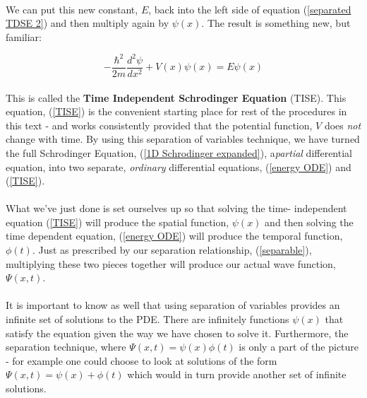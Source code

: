 \documentclass[12pt,letterpaper]{book}
\begin{document}
\paragraph*{} We can put this new constant, $E$, back into the left side of equation (\ref{separated TDSE 2}) and then multiply again by $\psi(x)$. The result is something new, but familiar:

\begin{equation}
\label{TISE}
-\frac{\hbar^2}{2m}\frac{d^2\psi}{dx^2} + V(x)\psi(x) = E\psi(x)
\end{equation}

\paragraph*{}This is called the \textbf{Time Independent Schrodinger Equation} (TISE). This equation, (\ref{TISE}) is the convenient starting place for rest of the procedures in this text - and works consistently provided that the potential function, $V$ does \textit{not} change with time. By using this separation of variables technique, we have turned the full Schrodinger Equation, (\ref{1D Schrodinger expanded}), a\textit{partial} differential equation, into two separate, \textit{ordinary} differential equations, 
(\ref{energy ODE}) and  (\ref{TISE}). 

\paragraph*{}What we've just done is set ourselves up so that solving the time- independent equation (\ref{TISE}) will produce the spatial function, $\psi(x)$ and then solving the time dependent equation, (\ref{energy ODE}) will produce the temporal function, $\phi(t)$. Just as prescribed by our separation relationship, (\ref{separable}), multiplying these two pieces together will produce our actual wave function, $\Psi(x,t)$. 

\paragraph*{}It is important to know as well that using separation of variables provides an infinite set of solutions to the PDE. There are infinitely functions $\psi(x)$ that satisfy the equation given the way we have chosen to solve it. Furthermore, the separation technique, where $\Psi(x,t) = \psi(x)\phi(t)$ is only a part of the picture - for example one could choose to look at solutions of the form $\Psi(x,t) = \psi(x) + \phi(t)$ which would in turn provide another set of infinite solutions. 
\end{document}
